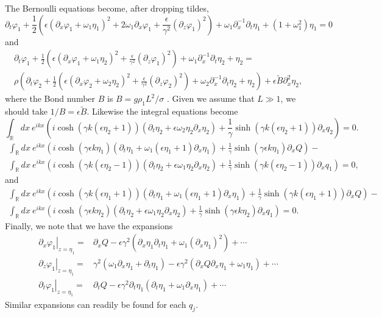 \documentclass[a4paper,11pt]{article}
\newcommand{\p}{\partial}
\begin{document}
The Bernoulli equations become, after dropping tildes, 
\[
\p_{t}\varphi_{1} + \frac{1}{2} \left(\epsilon(\p_{x}\varphi_{1}+\omega_{1}\eta_{1})^{2} + 2\omega_{1}\p_{x}\varphi_{1} + \frac{\epsilon}{\gamma^{2}}(\p_{z}\varphi_{1})^{2} \right) + \omega_{1}\p_{x}^{-1}\p_{t} \eta_{1} + (1+\omega_{1}^{2})\eta_{1} = 0
\]
and
\begin{align*}
\p_{t}\varphi_{1} + \frac{1}{2} \left( \epsilon(\p_{x}\varphi_{1}+\omega_{1}\eta_{2})^{2} + \frac{\epsilon}{\gamma^{2}}(\p_{z}\varphi_{1})^{2} \right) + \omega_{1}\p_{x}^{-1}\p_{t} \eta_{2} + \eta_{2} = \\
\rho\left(\p_{t}\varphi_{2} + \frac{1}{2} \left(\epsilon (\p_{x}\varphi_{2}+\omega_{2}\eta_{2})^{2} + \frac{\epsilon}{\gamma^{2}}(\p_{z}\varphi_{2})^{2} \right) + \omega_{2}\p_{x}^{-1}\p_{t} \eta_{2} + \eta_{2} \right) + \epsilon\tilde{B}\p_{x}^{2}\eta_{2}, 
\end{align*}
where the Bond number $B$ is $B = g\rho_{1}L^{2}/\sigma$ .  Given we assume that $L\gg1$, we should take $1/B = \epsilon \tilde{B}$.  Likewise the integral equations become 
\[
\int_{\mathbb{R}}dx ~ e^{ikx}\left(i\cosh(\gamma k(\epsilon\eta_{2}+1))(\p_{t}\eta_{2} + \epsilon\omega_{2}\eta_{2}\p_{x}\eta_{2}) + \frac{1}{\gamma}\sinh(\gamma k(\epsilon\eta_{2}+1))\p_{x} q_{2} \right) = 0.
\]
\begin{align*}
\int_{\mathbb{R}}dx ~ e^{ikx}\left(i\cosh(\gamma\epsilon k\eta_{1})(\p_{t}\eta_{1} + \omega_{1}(\epsilon\eta_{1}+1)\p_{x}\eta_{1}) + \frac{1}{\gamma}\sinh(\gamma \epsilon k\eta_{1})\p_{x} Q \right) -\\
\int_{\mathbb{R}}dx ~ e^{ikx}\left(i\cosh(\gamma k(\epsilon\eta_{2}-1))(\p_{t}\eta_{2} + \epsilon\omega_{1}\eta_{2}\p_{x}\eta_{2}) + \frac{1}{\gamma}\sinh(\gamma k(\epsilon\eta_{2}-1))\p_{x} q_{1} \right) = 0,
\end{align*}
and
\begin{align*}
\int_{\mathbb{R}}dx ~ e^{ikx}\left(i\cosh(\gamma k(\epsilon\eta_{1}+1))(\p_{t}\eta_{1} + \omega_{1}(\epsilon\eta_{1}+1)\p_{x}\eta_{1}) + \frac{1}{\gamma}\sinh(\gamma k(\epsilon\eta_{1}+1))\p_{x}Q \right) - \\
\int_{\mathbb{R}}dx ~ e^{ikx}\left(i\cosh(\gamma\epsilon k\eta_{2})(\p_{t}\eta_{2} + \epsilon\omega_{1}\eta_{2}\p_{x}\eta_{2}) + \frac{1}{\gamma}\sinh(\gamma \epsilon k\eta_{2})\p_{x} q_{1} \right) = 0.
\end{align*}
Finally, we note that we have the expansions
\begin{align}
\left.\p_{x}\varphi_{1}\right|_{z=\eta_{1}} = & \p_{x}Q - \epsilon\gamma^{2}(\p_{x}\eta_{1}\p_{t}\eta_{1} + \omega_{1}(\p_{x}\eta_{1})^{2}) + \cdots \label{xexp}\\
\left.\p_{z}\varphi_{1}\right|_{z=\eta_{1}} = & \gamma^{2}(\omega_{1}\p_{x}\eta_{1} + \p_{t}\eta_{1}) - \epsilon\gamma^{2}( \p_{x}Q\p_{x}\eta_{1} + \omega_{1}\eta_{1})+ \cdots \label{zexp}\\
\left.\p_{t}\varphi_{1}\right|_{z=\eta_{1}} = & \p_{t}Q - \epsilon\gamma^{2}\p_{t}\eta_{1}(\p_{t}\eta_{1} + \omega_{1}\p_{x}\eta_{1}) + \cdots \label{texp}
\end{align}
Similar expansions can readily be found for each $q_{j}$.  
\end{document}
